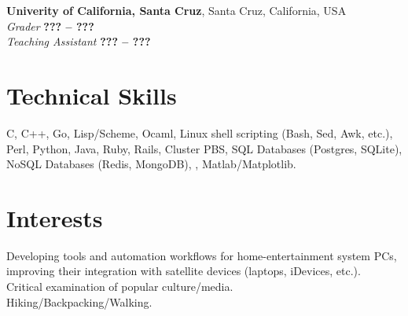 \documentclass[margin,line]{resume}
\begin{document}
\begin{resume}
    \textbf{Univerity of California, Santa Cruz}, Santa Cruz, California, USA \vspace{2mm}\\\vspace{1mm}%
    \textsl{Grader} \hfill \textbf{??? -- ???}\\

    \textsl{Teaching Assistant} \hfill \textbf{??? -- ???}\\


    \section{\mysidestyle Technical Skills} 

    C, C++, Go, Lisp/Scheme, Ocaml,
    Linux shell scripting (Bash, Sed, Awk, etc.),
    Perl, Python, Java, Ruby, Rails,
    Cluster PBS, SQL Databases (Postgres, SQLite), NoSQL Databases (Redis, MongoDB),
    \LaTeXe, Matlab/Matplotlib.

    \section{\mysidestyle Interests} 

    Developing tools and automation workflows for home-entertainment system PCs, improving their integration with satellite devices (laptops, iDevices, etc.). \vspace{1mm}\\%
    Critical examination of popular culture/media. \vspace{1mm}\\%
    Hiking/Backpacking/Walking. \vspace{1mm}\\%





\end{resume}
\end{document}
